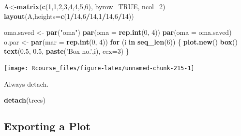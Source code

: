 \documentclass[]{book}
\newenvironment{Shaded}{\begin{snugshade}}{\end{snugshade}}
\newcommand{\KeywordTok}[1]{\textcolor[rgb]{0.13,0.29,0.53}{\textbf{#1}}}
\newcommand{\DataTypeTok}[1]{\textcolor[rgb]{0.13,0.29,0.53}{#1}}
\newcommand{\DecValTok}[1]{\textcolor[rgb]{0.00,0.00,0.81}{#1}}
\newcommand{\FloatTok}[1]{\textcolor[rgb]{0.00,0.00,0.81}{#1}}
\newcommand{\StringTok}[1]{\textcolor[rgb]{0.31,0.60,0.02}{#1}}
\newcommand{\OtherTok}[1]{\textcolor[rgb]{0.56,0.35,0.01}{#1}}
\newcommand{\ControlFlowTok}[1]{\textcolor[rgb]{0.13,0.29,0.53}{\textbf{#1}}}
\newcommand{\OperatorTok}[1]{\textcolor[rgb]{0.81,0.36,0.00}{\textbf{#1}}}
\newcommand{\NormalTok}[1]{#1}
\theoremstyle{definition}
\theoremstyle{definition}
\theoremstyle{definition}
\theoremstyle{remark}
\begin{document}
\begin{Shaded}
\begin{Highlighting}[]
\NormalTok{A<-}\KeywordTok{matrix}\NormalTok{(}\KeywordTok{c}\NormalTok{(}\DecValTok{1}\NormalTok{,}\DecValTok{1}\NormalTok{,}\DecValTok{2}\NormalTok{,}\DecValTok{3}\NormalTok{,}\DecValTok{4}\NormalTok{,}\DecValTok{4}\NormalTok{,}\DecValTok{5}\NormalTok{,}\DecValTok{6}\NormalTok{), }\DataTypeTok{byrow=}\OtherTok{TRUE}\NormalTok{, }\DataTypeTok{ncol=}\DecValTok{2}\NormalTok{)}
\KeywordTok{layout}\NormalTok{(A,}\DataTypeTok{heights=}\KeywordTok{c}\NormalTok{(}\DecValTok{1}\OperatorTok{/}\DecValTok{14}\NormalTok{,}\DecValTok{6}\OperatorTok{/}\DecValTok{14}\NormalTok{,}\DecValTok{1}\OperatorTok{/}\DecValTok{14}\NormalTok{,}\DecValTok{6}\OperatorTok{/}\DecValTok{14}\NormalTok{))}

\NormalTok{oma.saved <-}\StringTok{ }\KeywordTok{par}\NormalTok{(}\StringTok{"oma"}\NormalTok{)}
\KeywordTok{par}\NormalTok{(}\DataTypeTok{oma =} \KeywordTok{rep.int}\NormalTok{(}\DecValTok{0}\NormalTok{, }\DecValTok{4}\NormalTok{))}
\KeywordTok{par}\NormalTok{(}\DataTypeTok{oma =}\NormalTok{ oma.saved)}
\NormalTok{o.par <-}\StringTok{ }\KeywordTok{par}\NormalTok{(}\DataTypeTok{mar =} \KeywordTok{rep.int}\NormalTok{(}\DecValTok{0}\NormalTok{, }\DecValTok{4}\NormalTok{))}
\ControlFlowTok{for}\NormalTok{ (i }\ControlFlowTok{in} \KeywordTok{seq_len}\NormalTok{(}\DecValTok{6}\NormalTok{)) \{}
    \KeywordTok{plot.new}\NormalTok{()}
    \KeywordTok{box}\NormalTok{()}
    \KeywordTok{text}\NormalTok{(}\FloatTok{0.5}\NormalTok{, }\FloatTok{0.5}\NormalTok{, }\KeywordTok{paste}\NormalTok{(}\StringTok{'Box no.'}\NormalTok{,i), }\DataTypeTok{cex=}\DecValTok{3}\NormalTok{)}
\NormalTok{\}}
\end{Highlighting}
\end{Shaded}

\texttt{[image: Rcourse\_files/figure-latex/unnamed-chunk-215-1]}

Always detach.

\begin{Shaded}
\begin{Highlighting}[]
\KeywordTok{detach}\NormalTok{(trees)}
\end{Highlighting}
\end{Shaded}

\subsection{Exporting a Plot}\label{exporting-a-plot}
\end{document}
